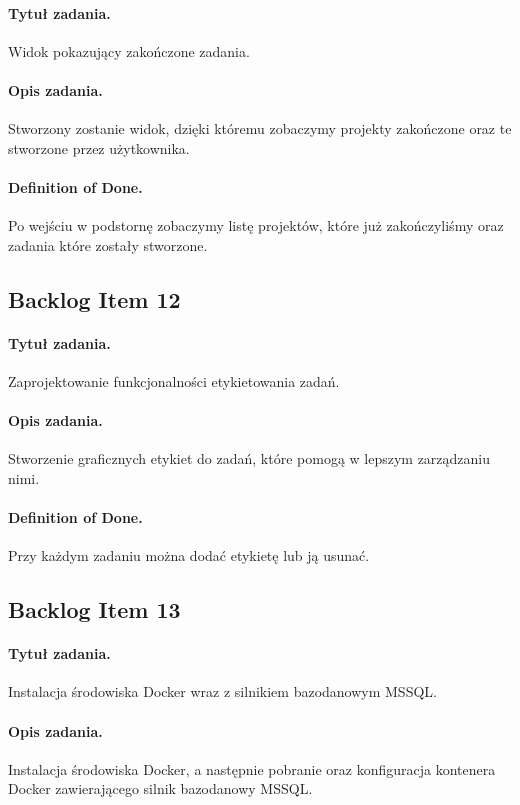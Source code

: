 ﻿\documentclass[a4paper]{article}
\begin{document}
\paragraph{Tytuł zadania.} Widok pokazujący zakończone zadania.
\paragraph{Opis zadania.} Stworzony zostanie widok, dzięki któremu zobaczymy projekty zakończone oraz te stworzone przez użytkownika.
\paragraph{Definition of Done.} Po wejściu w podstornę zobaczymy listę projektów, które już zakończyliśmy oraz zadania które zostały stworzone.

\subsection{Backlog Item 12} 
\paragraph{Tytuł zadania.} Zaprojektowanie funkcjonalności etykietowania zadań.
\paragraph{Opis zadania.} Stworzenie graficznych etykiet do zadań, które pomogą w lepszym zarządzaniu nimi.
\paragraph{Definition of Done.} Przy każdym zadaniu można dodać etykietę lub ją usunać.






\subsection{Backlog Item 13} 
\paragraph{Tytuł zadania.}  Instalacja środowiska Docker wraz z silnikiem bazodanowym MSSQL.
\paragraph{Opis zadania.} Instalacja środowiska Docker, a następnie pobranie oraz konfiguracja kontenera Docker zawierającego silnik bazodanowy MSSQL.
\end{document}

